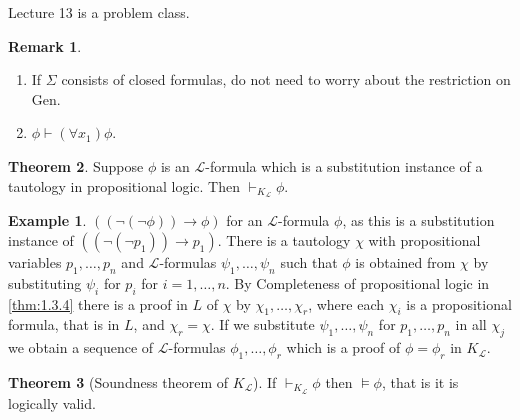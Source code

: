 \documentclass{article}
\newcommand{\rb}[1]{\left( #1 \right)}
\newcommand{\notb}[1]{\rb{\neg #1}}
\newcommand{\impb}[2]{\rb{#1 \rightarrow #2}}
\newcommand{\fab}[1]{\rb{\forall #1}}
\theoremstyle{definition}\newtheorem{definition}{Definition}[subsection]
\theoremstyle{definition}\newtheorem{remark}[definition]{Remark}
\theoremstyle{definition}\newtheorem*{example}{Example}
\theoremstyle{definition}\newtheorem*{note}{Note}
\newtheorem{theorem}[definition]{Theorem}
\begin{document}

Lecture 13 is a problem class.


\begin{remark}
\hfill
\begin{enumerate}
\item If $ \Sigma $ consists of closed formulas, do not need to worry about the restriction on Gen.
\item $ \phi \vdash \fab{x_1}\phi $.
\end{enumerate}
\end{remark}

\begin{theorem}
\label{thm:2.4.4}
Suppose $ \phi $ is an $ \mathcal{L} $-formula which is a substitution instance of a tautology in propositional logic. Then $ \vdash_{K_\mathcal{L}} \phi $.
\end{theorem}

\begin{example}
$ \impb{\notb{\notb{\phi}}}{\phi} $ for an $ \mathcal{L} $-formula $ \phi $, as this is a substitution instance of $ \impb{\notb{\notb{p_1}}}{p_1} $. There is a tautology $ \chi $ with propositional variables $ p_1, \dots, p_n $ and $ \mathcal{L} $-formulas $ \psi_1, \dots, \psi_n $ such that $ \phi $ is obtained from $ \chi $ by substituting $ \psi_i $ for $ p_i $ for $ i = 1, \dots, n $. By Completeness of propositional logic in \ref{thm:1.3.4} there is a proof in $ L $ of $ \chi $ by $ \chi_1, \dots, \chi_r $, where each $ \chi_i $ is a propositional formula, that is in $ L $, and $ \chi_r = \chi $. If we substitute $ \psi_1, \dots, \psi_n $ for $ p_1, \dots, p_n $ in all $ \chi_j $ we obtain a sequence of $ \mathcal{L} $-formulas $ \phi_1, \dots, \phi_r $ which is a proof of $ \phi = \phi_r $ in $ K_\mathcal{L} $.
\end{example}

\begin{theorem}[Soundness theorem of $ K_\mathcal{L} $]
\label{thm:2.4.5}
If $ \vdash_{K_\mathcal{L}} \phi $ then $ \vDash \phi $, that is it is logically valid.
\end{theorem}
\end{document}
